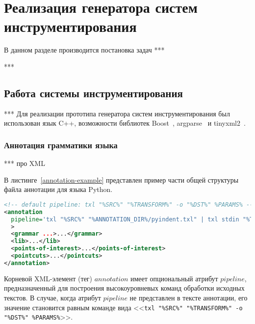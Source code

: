 \chapter{Реализация генератора систем инструментирования}

В данном разделе производится постановка задач ***

***

\section{Работа системы инструментирования}

***
Для реализации прототипа генератора систем инструментирования был использован язык C++, возможности библиотек Boost~\cite{boost}, argparse~\cite{argparse} и tinyxml2~\cite{tinyxml2}.

\subsection{Аннотация грамматики языка}

***
про XML

В листинге~\ref{annotation-example} представлен пример части общей структуры файла аннотации для языка Python.

\begin{lstlisting}[frame=single, language=XML, label={annotation-example}, caption={Пример общей структуры файла аннотации.}]
<!-- default pipeline: txl "%SRC%" "%TRANSFORM%" -o "%DST%" %PARAMS% -->
<annotation
  pipeline='txl "%SRC%" "%ANNOTATION_DIR%/pyindent.txl" | txl stdin "%TRANSFORM%" -o "%DST%" %PARAMS%'
  >
  <grammar ...>...</grammar>
  <lib>...</lib>
  <points-of-interest>...</points-of-interest>
  <pointcuts>...</pointcuts>
</annotation>
\end{lstlisting}

Корневой XML-элемент (тег) $annotation$ имеет опциональный атрибут $pipeline$, предназначенный для построения высокоуровневых команд обработки исходных текстов.
В случае, когда атрибут $pipeline$ не представлен в тексте аннотации, его значение становится равным команде вида <<\lstinline{txl "%SRC%" "%TRANSFORM%" -o "%DST%" %PARAMS%}>>.

